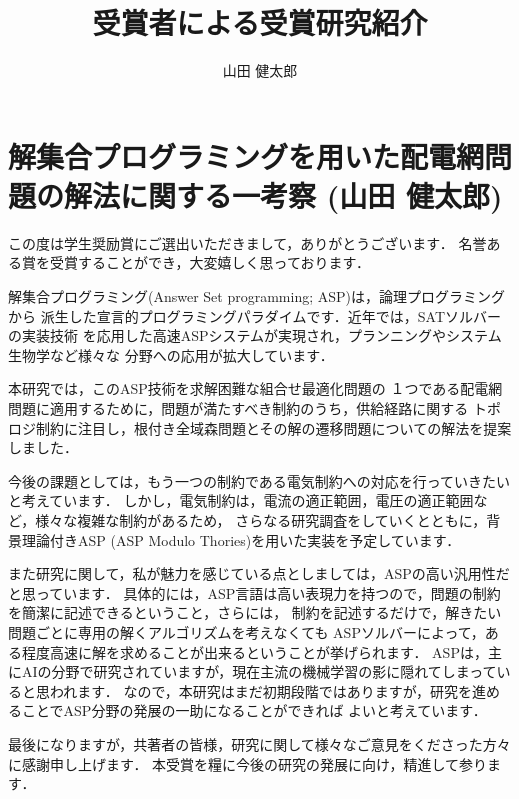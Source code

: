 \documentclass[T]{compsoft}
\begin{document}
\title{受賞者による受賞研究紹介}

%
\author{山田 健太郎}

\maketitle \thispagestyle {empty}

\section{解集合プログラミングを用いた配電網問題の解法に関する一考察 (山田 健太郎)}
この度は学生奨励賞にご選出いただきまして，ありがとうございます．
名誉ある賞を受賞することができ，大変嬉しく思っております．

解集合プログラミング(Answer Set programming; ASP)は，論理プログラミングから
派生した宣言的プログラミングパラダイムです．近年では，SATソルバーの実装技術
を応用した高速ASPシステムが実現され，プランニングやシステム生物学など様々な
分野への応用が拡大しています．

本研究では，このASP技術を求解困難な組合せ最適化問題の
１つである配電網問題に適用するために，問題が満たすべき制約のうち，供給経路に関する
トポロジ制約に注目し，根付き全域森問題とその解の遷移問題についての解法を提案しました．

今後の課題としては，もう一つの制約である電気制約への対応を行っていきたいと考えています．
しかし，電気制約は，電流の適正範囲，電圧の適正範囲など，様々な複雑な制約があるため，
さらなる研究調査をしていくとともに，背景理論付きASP (ASP Modulo Thories)を用いた実装を予定しています．

また研究に関して，私が魅力を感じている点としましては，ASPの高い汎用性だと思っています．
具体的には，ASP言語は高い表現力を持つので，問題の制約を簡潔に記述できるということ，さらには，
制約を記述するだけで，解きたい問題ごとに専用の解くアルゴリズムを考えなくても
ASPソルバーによって，ある程度高速に解を求めることが出来るということが挙げられます．
ASPは，主にAIの分野で研究されていますが，現在主流の機械学習の影に隠れてしまっていると思われます．
なので，本研究はまだ初期段階ではありますが，研究を進めることでASP分野の発展の一助になることができれば
よいと考えています．

最後になりますが，共著者の皆様，研究に関して様々なご意見をくださった方々に感謝申し上げます．
本受賞を糧に今後の研究の発展に向け，精進して参ります．
\end{document}
